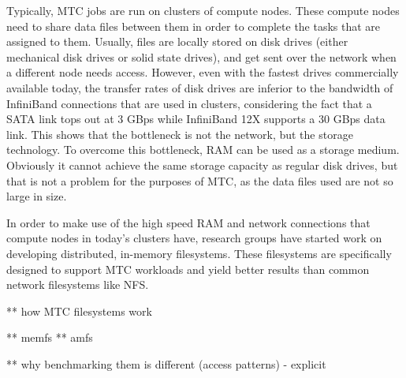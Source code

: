 Typically, MTC jobs are run on clusters of compute nodes. These compute nodes need to share data files between them in order to complete the tasks that are assigned to them. Usually, files are locally stored on disk drives (either mechanical disk drives or solid state drives), and get sent over the network when a different node needs access. However, even with the fastest drives commercially available today, the transfer rates of disk drives are inferior to the bandwidth of InfiniBand connections that are used in clusters, considering the fact that a SATA link tops out at 3 GBps while InfiniBand 12X supports a 30 GBps data link. This shows that the bottleneck is not the network, but the storage technology. To overcome this bottleneck, RAM can be used as a storage medium. Obviously it cannot achieve the same storage capacity as regular disk drives, but that is not a problem for the purposes of MTC, as the data files used are not so large in size.

In order to make use of the high speed RAM and network connections that compute nodes in today's clusters have, research groups have started work on developing distributed, in-memory filesystems. These filesystems are specifically designed to support MTC workloads and yield better results than common network filesystems like NFS.


** how MTC filesystems work

** memfs
** amfs

** why benchmarking them is different (access patterns) - explicit